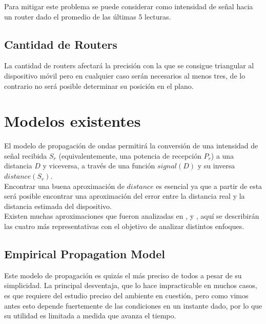 \documentclass[journal]{IEEEtran}
\begin{document}
Para mitigar este problema se puede considerar como intensidad de señal hacia un router dado el promedio de las últimas 5 lecturas.\\

\subsection{Cantidad de Routers}

La cantidad de routers afectará la precisión con la que se consigue triangular al dispositivo móvil pero en cualquier caso serán necesarios al menos tres, de lo contrario no será posible determinar su posición en el plano.\\

\section{Modelos existentes}

El modelo de propagación de ondas permitirá la conversión de una intensidad de señal recibida $S_r$ (equivalentemente, una potencia de recepción $P_r$) a una distancia $D$ y viceversa, a través de una función $signal(D)$ y su inversa $distance(S_r)$.\\

Encontrar una buena aproximación de $distance$ es esencial ya que a partir de esta será posible encontrar una aproximación del error entre la distancia real y la distancia estimada del dispositivo.\\

Existen muchas aproximaciones que fueron analizadas en \cite{low:cost:location:determination}, \cite{radar:tracking:system} y \cite{generic:model:signal:propagation}, aquí se describirán las cuatro más representativas con el objetivo de analizar distintos enfoques.\\

\subsection{Empirical Propagation Model}

Este modelo de propagación es quizás el más preciso de todos a pesar de su simplicidad. La principal desventaja, que lo hace impracticable en muchos casos, es que requiere del estudio preciso del ambiente en cuestión, pero como vimos antes esto depende fuertemente de las condiciones en un instante dado, por lo que su utilidad es limitada a medida que avanza el tiempo.
\end{document}
